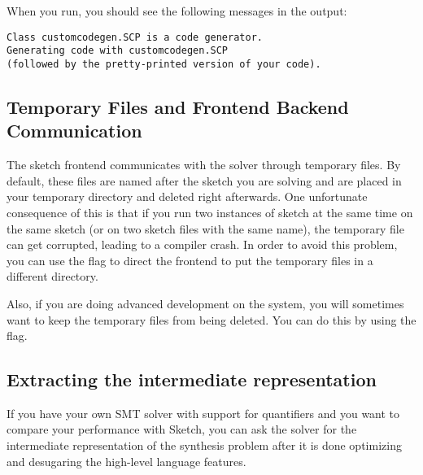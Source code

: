 When you run, you should see the following messages in the output:
\begin{lstlisting}
Class customcodegen.SCP is a code generator.
Generating code with customcodegen.SCP
(followed by the pretty-printed version of your code).
\end{lstlisting}



\subsection{Temporary Files and Frontend Backend Communication}

The sketch frontend communicates with the solver through temporary files. 
By default, these files are named after the sketch you are solving and 
are placed in your temporary directory and deleted right afterwards. One 
unfortunate consequence of this is that if you run two instances of sketch at the same 
time on the same sketch (or on two sketch files with the same name), the temporary file
can get corrupted, leading to a compiler crash. In order to avoid this problem, you can use the flag 
 to direct the frontend to put the temporary files in a different directory. 


Also, if you are doing advanced development on the system, you will sometimes want to keep 
the temporary files from being deleted. You can do this by using the  flag.




\subsection{Extracting the intermediate representation}
If you have your own SMT solver with support for quantifiers and you want to compare your performance with Sketch, you can ask the solver for the intermediate representation of the synthesis problem after it is done optimizing and desugaring the high-level language features. 


